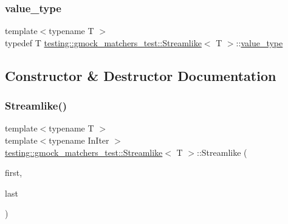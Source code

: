 \mbox{\label{classtesting_1_1gmock__matchers__test_1_1_streamlike_a7e2c2e021676c1ed5dea63cdd019661c}} 
\subsubsection{\texorpdfstring{value\_type}{value\_type}}
{\footnotesize\ttfamily template$<$typename T $>$ \\
typedef T \mbox{\hyperlink{classtesting_1_1gmock__matchers__test_1_1_streamlike}{testing\+::gmock\+\_\+matchers\+\_\+test\+::\+Streamlike}}$<$ T $>$\+::\mbox{\hyperlink{classtesting_1_1gmock__matchers__test_1_1_streamlike_a7e2c2e021676c1ed5dea63cdd019661c}{value\+\_\+type}}}



\subsection{Constructor \& Destructor Documentation}
\mbox{\label{classtesting_1_1gmock__matchers__test_1_1_streamlike_abf5560c86ad5d9563cb8f477f06046fe}} 
\subsubsection{\texorpdfstring{Streamlike()}{Streamlike()}}
{\footnotesize\ttfamily template$<$typename T $>$ \\
template$<$typename In\+Iter $>$ \\
\mbox{\hyperlink{classtesting_1_1gmock__matchers__test_1_1_streamlike}{testing\+::gmock\+\_\+matchers\+\_\+test\+::\+Streamlike}}$<$ T $>$\+::Streamlike (\begin{DoxyParamCaption}\item[{In\+Iter}]{first,  }\item[{In\+Iter}]{last }\end{DoxyParamCaption})\hspace{0.3cm}{\ttfamily [inline]}}



